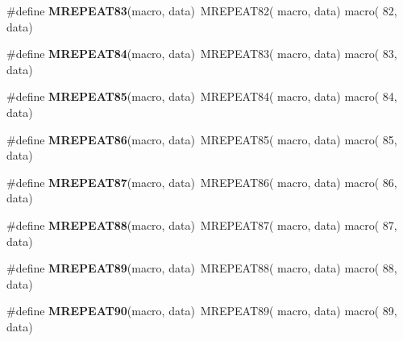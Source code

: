 \begin{DoxyCompactItemize}
\item 
\hypertarget{group__group__xmega__utils__mrepeat_ga05a5bfb2999f879cbf95768b7cc98d8f}{\#define {\bfseries M\-R\-E\-P\-E\-A\-T83}(macro, data)~M\-R\-E\-P\-E\-A\-T82( macro, data)   macro( 82, data)}\label{group__group__xmega__utils__mrepeat_ga05a5bfb2999f879cbf95768b7cc98d8f}

\item 
\hypertarget{group__group__xmega__utils__mrepeat_ga8892fab4572ce20132d8237a4fea0f3e}{\#define {\bfseries M\-R\-E\-P\-E\-A\-T84}(macro, data)~M\-R\-E\-P\-E\-A\-T83( macro, data)   macro( 83, data)}\label{group__group__xmega__utils__mrepeat_ga8892fab4572ce20132d8237a4fea0f3e}

\item 
\hypertarget{group__group__xmega__utils__mrepeat_gac310966754e3b2f99d3bc542eabbcd32}{\#define {\bfseries M\-R\-E\-P\-E\-A\-T85}(macro, data)~M\-R\-E\-P\-E\-A\-T84( macro, data)   macro( 84, data)}\label{group__group__xmega__utils__mrepeat_gac310966754e3b2f99d3bc542eabbcd32}

\item 
\hypertarget{group__group__xmega__utils__mrepeat_ga30355c63cfe5a0c1ed9928f24d941206}{\#define {\bfseries M\-R\-E\-P\-E\-A\-T86}(macro, data)~M\-R\-E\-P\-E\-A\-T85( macro, data)   macro( 85, data)}\label{group__group__xmega__utils__mrepeat_ga30355c63cfe5a0c1ed9928f24d941206}

\item 
\hypertarget{group__group__xmega__utils__mrepeat_gad120b88ef29e4f9b0f9017dc084674af}{\#define {\bfseries M\-R\-E\-P\-E\-A\-T87}(macro, data)~M\-R\-E\-P\-E\-A\-T86( macro, data)   macro( 86, data)}\label{group__group__xmega__utils__mrepeat_gad120b88ef29e4f9b0f9017dc084674af}

\item 
\hypertarget{group__group__xmega__utils__mrepeat_ga7d45423a28a7d85979fa03dfe7b26fdd}{\#define {\bfseries M\-R\-E\-P\-E\-A\-T88}(macro, data)~M\-R\-E\-P\-E\-A\-T87( macro, data)   macro( 87, data)}\label{group__group__xmega__utils__mrepeat_ga7d45423a28a7d85979fa03dfe7b26fdd}

\item 
\hypertarget{group__group__xmega__utils__mrepeat_gad01c89babbc1d97120f14f62818112d2}{\#define {\bfseries M\-R\-E\-P\-E\-A\-T89}(macro, data)~M\-R\-E\-P\-E\-A\-T88( macro, data)   macro( 88, data)}\label{group__group__xmega__utils__mrepeat_gad01c89babbc1d97120f14f62818112d2}

\item 
\hypertarget{group__group__xmega__utils__mrepeat_gae85d4d27c3fbd9b354f04156111d089d}{\#define {\bfseries M\-R\-E\-P\-E\-A\-T90}(macro, data)~M\-R\-E\-P\-E\-A\-T89( macro, data)   macro( 89, data)}\label{group__group__xmega__utils__mrepeat_gae85d4d27c3fbd9b354f04156111d089d}


\end{DoxyCompactItemize}

